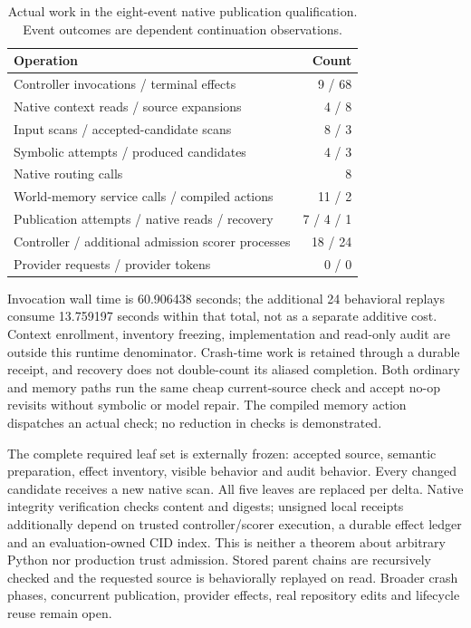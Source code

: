 \begin{table}[htbp]
\centering
\caption{Actual work in the eight-event native publication qualification.
Event outcomes are dependent continuation observations.}
\begin{tabular}{lr}
\toprule
Operation & Count \\
\midrule
Controller invocations / terminal effects & 9 / 68 \\
Native context reads / source expansions & 4 / 8 \\
Input scans / accepted-candidate scans & 8 / 3 \\
Symbolic attempts / produced candidates & 4 / 3 \\
Native routing calls & 8 \\
World-memory service calls / compiled actions & 11 / 2 \\
Publication attempts / native reads / recovery & 7 / 4 / 1 \\
Controller / additional admission scorer processes & 18 / 24 \\
Provider requests / provider tokens & 0 / 0 \\
\bottomrule
\end{tabular}
\end{table}

Invocation wall time is 60.906438 seconds; the additional 24 behavioral
replays consume 13.759197 seconds within that total, not as a separate additive
cost. Context enrollment, inventory freezing, implementation and read-only
audit are outside this runtime denominator. Crash-time work is retained through
a durable receipt, and recovery does not double-count its aliased completion.
Both ordinary and memory paths run the same cheap current-source check and
accept no-op revisits without symbolic or model repair. The compiled memory
action dispatches an actual check; no reduction in checks is demonstrated.

The complete required leaf set is externally frozen: accepted source,
semantic preparation, effect inventory, visible behavior and audit behavior.
Every changed candidate receives a new native scan. All five leaves are
replaced per delta. Native integrity verification checks content and digests;
unsigned local receipts additionally depend on trusted controller/scorer
execution, a durable effect ledger and an evaluation-owned CID index. This
is neither a theorem about arbitrary Python nor production trust admission.
Stored parent chains are recursively checked and the requested source is
behaviorally replayed on read. Broader crash phases, concurrent publication,
provider effects, real repository edits and lifecycle reuse remain open.

